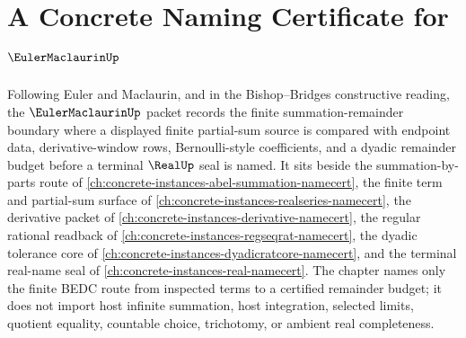 \chapter{A Concrete Naming Certificate for $\EulerMaclaurinUp$}
\label{ch:concrete-instances-euler-maclaurin-namecert}

Following Euler and Maclaurin, and in the Bishop--Bridges constructive reading, the $\EulerMaclaurinUp$ packet records the finite summation-remainder boundary where a displayed finite partial-sum source is compared with endpoint data, derivative-window rows, Bernoulli-style coefficients, and a dyadic remainder budget before a terminal $\RealUp$ seal is named. It sits beside the summation-by-parts route of \autoref{ch:concrete-instances-abel-summation-namecert}, the finite term and partial-sum surface of \autoref{ch:concrete-instances-realseries-namecert}, the derivative packet of \autoref{ch:concrete-instances-derivative-namecert}, the regular rational readback of \autoref{ch:concrete-instances-regseqrat-namecert}, the dyadic tolerance core of \autoref{ch:concrete-instances-dyadicratcore-namecert}, and the terminal real-name seal of \autoref{ch:concrete-instances-real-namecert}. The chapter names only the finite BEDC route from inspected terms to a certified remainder budget; it does not import host infinite summation, host integration, selected limits, quotient equality, countable choice, trichotomy, or ambient real completeness.

